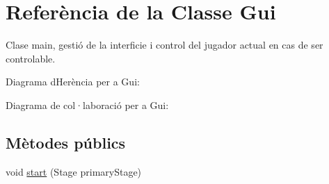 \hypertarget{class_gui}{}\section{Referència de la Classe Gui}
\label{class_gui}


Clase main, gestió de la interficie i control del jugador actual en cas de ser controlable.  




Diagrama d\textquotesingle{}Herència per a Gui\+:


Diagrama de col·laboració per a Gui\+:
\subsection*{Mètodes públics}
\begin{DoxyCompactItemize}
\item 
void \mbox{\hyperlink{class_gui_a7997885cf723f790c4ec5b2328407023}{start}} (Stage primary\+Stage)
\end{DoxyCompactItemize}
